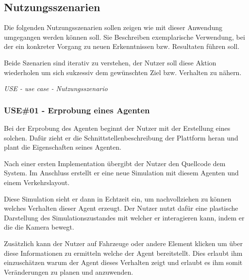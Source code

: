 
\subsection{Nutzungsszenarien}

Die folgenden Nutzungsszenarien sollen zeigen wie mit dieser Anwendung umgegangen werden können soll.
Sie Beschreiben exemplarische Verwendung, bei der ein konkreter Vorgang zu neuen Erkenntnissen bzw. Resultaten führen soll.

Beide Szenarien sind iterativ zu verstehen, der Nutzer soll diese Aktion wiederholen um sich sukzessiv dem gewünschten Ziel bzw. Verhalten zu nähern.

\textit{USE - use case - Nutzungsszenario}


%
%
%
%

\subsubsection{USE\#01 - Erprobung eines Agenten}

Bei der Erprobung des Agenten beginnt der Nutzer mit der Erstellung eines solchen.
Dafür zieht er die Schnittstellenbeschreibung der Plattform heran und plant die Eigenschaften seines Agenten.

Nach einer ersten Implementation übergibt der Nutzer den Quellcode dem System.
Im Anschluss erstellt er eine neue Simulation mit diesem Agenten und einem Verkehrslayout.

Diese Simulation sieht er dann in Echtzeit ein, um nachvollziehen zu können welches Verhalten dieser Agent erzeugt.
Der Nutzer nutzt dafür eine plastische Darstellung des Simulationszustandes mit welcher er interagieren kann, indem er die die Kamera bewegt.

Zusätzlich kann der Nutzer auf Fahrzeuge oder andere Element klicken um über diese Informationen zu ermitteln welche der Agent bereitstellt.
Dies erlaubt ihm einzuschätzen warum der Agent dieses Verhalten zeigt und erlaubt es ihm somit Veränderungen zu planen und anzuwenden.
